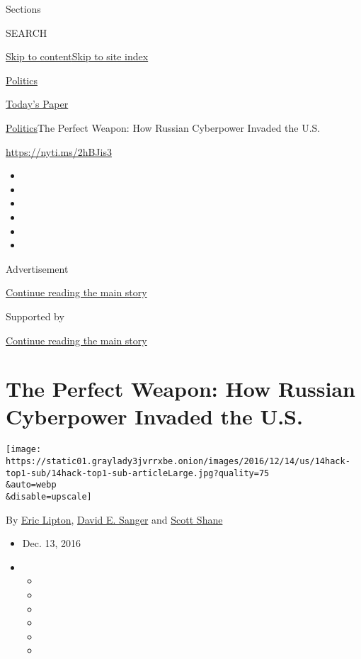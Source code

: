 Sections

SEARCH

\protect\hyperlink{site-content}{Skip to
content}\protect\hyperlink{site-index}{Skip to site index}

\href{https://www.nytimes3xbfgragh.onion/section/politics}{Politics}

\href{https://myaccount.nytimes3xbfgragh.onion/auth/login?response_type=cookie\&client_id=vi}{}

\href{https://www.nytimes3xbfgragh.onion/section/todayspaper}{Today's
Paper}

\href{/section/politics}{Politics}\textbar{}The Perfect Weapon: How
Russian Cyberpower Invaded the U.S.

\url{https://nyti.ms/2hBJis3}

\begin{itemize}
\item
\item
\item
\item
\item
\item
\end{itemize}

Advertisement

\protect\hyperlink{after-top}{Continue reading the main story}

Supported by

\protect\hyperlink{after-sponsor}{Continue reading the main story}

\hypertarget{the-perfect-weapon-how-russian-cyberpower-invaded-the-us}{%
\section{The Perfect Weapon: How Russian Cyberpower Invaded the
U.S.}\label{the-perfect-weapon-how-russian-cyberpower-invaded-the-us}}

\texttt{[image: https://static01.graylady3jvrrxbe.onion/images/2016/12/14/us/14hack-top1-sub/14hack-top1-sub-articleLarge.jpg?quality=75\\\&auto=webp\\\&disable=upscale]}

By \href{https://www.nytimes3xbfgragh.onion/by/eric-lipton}{Eric
Lipton},
\href{https://www.nytimes3xbfgragh.onion/by/david-e-sanger}{David E.
Sanger} and
\href{https://www.nytimes3xbfgragh.onion/by/scott-shane}{Scott Shane}

\begin{itemize}
\item
  Dec. 13, 2016
\item
  \begin{itemize}
  \item
  \item
  \item
  \item
  \item
  \item
  \end{itemize}
\end{itemize}

